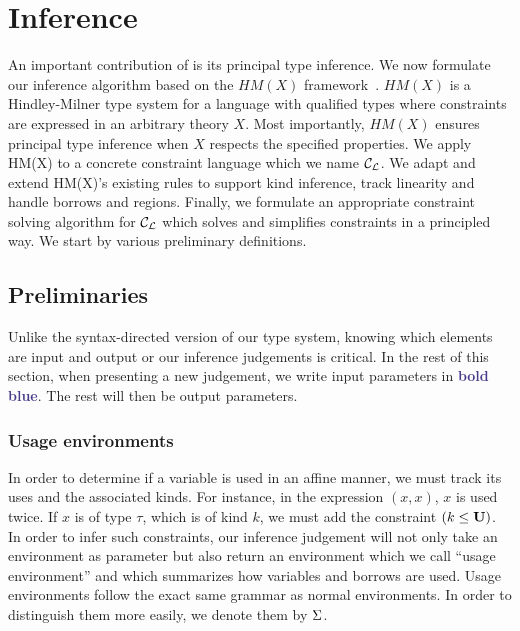 \section{Inference}
\label{inference}

An important contribution of \affe is its principal type inference.
We now formulate our inference algorithm
based on the $HM(X)$ framework~\citep{DBLP:journals/tapos/OderskySW99}.
$HM(X)$ is a Hindley-Milner type system for a language
with qualified types where constraints are expressed in an arbitrary
theory $X$.
Most importantly,
$HM(X)$ ensures principal type inference
when $X$ respects the specified properties.
We apply HM(X) to a concrete constraint language which we name ${\mathcal C_{\mathcal L}}$.
We adapt and extend HM(X)'s existing rules to support kind inference,
track linearity and handle borrows and regions. Finally, we
formulate an appropriate constraint solving algorithm for ${\mathcal C_{\mathcal L}}$
which solves and simplifies constraints in a principled way.
We start by various preliminary definitions.

\subsection{Preliminaries}

Unlike the syntax-directed version of our type system, knowing which elements
are input and output or our inference judgements is critical. In the rest
of this section, when presenting a new judgement,
we write input parameters in \textbf{\textcolor{DarkSlateBlue}{bold blue}}. The rest will then be
output parameters.

\subsubsection{Usage environments}


In order to determine if a variable is used in an affine manner, we must track
its uses and the associated kinds. For instance, in the expression
$(x,x)$, $x$ is used twice. If $x$ is of type $\tau$, which is of kind $k$,
we must add the constraint $(k \leq \mathbf{U})$.
%
In order to infer such constraints, our inference judgement will not only
take an environment as parameter but also return an environment which
we call ``usage environment'' and which summarizes how variables and borrows
are used. Usage environments follow the exact same grammar
as normal environments. In order to distinguish them more easily,
we denote them by $\Sigma$.

